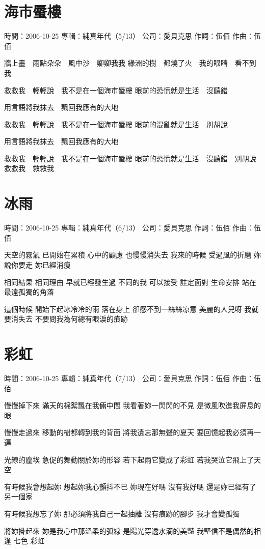 \documentclass[UTF8,a4paper,oneside,twocolumn,12pt]{ctexbook}
\newcommand{\infopair}[2]{\textbullet #1：#2}
\newcommand{\zc}[1][伍佰]{\infopair{作詞}{#1}}
\newcommand{\zq}[1][伍佰]{\infopair{作曲}{#1}}
\newcommand{\zj}[1]{\infopair{專輯}{#1}}
\newcommand{\sj}[1]{\infopair{時間}{#1}}
\newcommand{\gs}[1]{\infopair{公司}{#1}}
\newenvironment{info}{\begin{flushleft}\kaishu
	}
	{\end{flushleft}\normalsize\yahei\par}
\newenvironment{lyric}{
	}
{}
\begin{document}
\section{海市蜃樓}
\begin{info}
	\sj{2006-10-25}
	\zj{純真年代（5/13）}
	\gs{愛貝克思}
	\zc
	\zq
\end{info}
\begin{lyric}
	牆上畫　雨點朵朵　風中沙　卿卿我我
	綠洲的樹　都燒了火　我的眼睛　看不到我

	救救我　輕輕說　我不是在一個海市蜃樓
	眼前的恐慌就是生活　沒聽錯

	用言語將我抹去　飄回我應有的大地

	救救我　輕輕說　我不是在一個海市蜃樓
	眼前的混亂就是生活　別胡說

	用言語將我抹去　飄回我應有的大地

	救救我　輕輕說　我不是在一個海市蜃樓
	眼前的恐慌就是生活　沒聽錯　別胡說　救救我　救救我
\end{lyric}

\section{冰雨}
\begin{info}
	\sj{2006-10-25}
	\zj{純真年代（6/13）}
	\gs{愛貝克思}
	\zc
	\zq
\end{info}
\begin{lyric}
	天空的霧氣 已開始在累積
	心中的顧慮 也慢慢消失去
	我來的時候 受過風的折磨
	妳說你要走 妳已經消瘦

	相同結果 相同理由 早就已經發生過
	不同的我 可以接受 註定面對 生命安排
	站在最遠孤獨的角落

	這個時候 開始下起冰冷冷的雨
	落在身上 卻感不到一絲絲凉意
	美麗的人兒呀 我就要消失去
	不要問我為何總有眼淚的痕跡
\end{lyric}

\section{彩虹}
\begin{info}
	\sj{2006-10-25}
	\zj{純真年代（7/13）}
	\gs{愛貝克思}
	\zc
	\zq
\end{info}
\begin{lyric}
	慢慢掉下來 滿天的棉絮飄在我倆中間
	我看著妳一閃閃的不見 是微風吹進我屏息的眼

	慢慢走過來 移動的樹都轉到我的背面
	將我遺忘那無聲的夏天 要回憶起我必須再一遍

	光線的塵埃 急促的舞動關於妳的形容
	若下起雨它變成了彩虹 若我哭泣它飛上了天空

	有時候我會想起妳 想起妳我心顫抖不已
	妳現在好嗎 沒有我好嗎 還是妳已經有了另一個家

	有時候我想忘了妳 那必須將我自己一起抽離
	沒有痕跡的腳步 我才會變孤獨

	將妳掛起來 妳是我心中那溫柔的弧線
	是陽光穿透水滴的美豔 我堅信不是偶然的相逢 七色 彩虹
\end{lyric}
\end{document}
